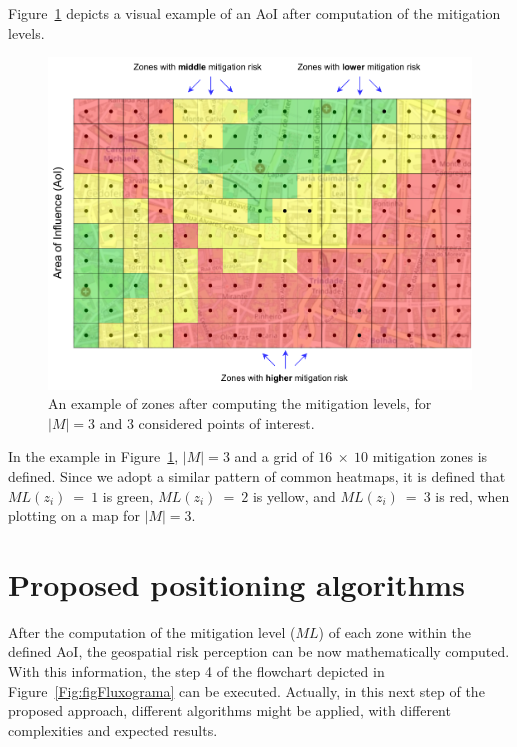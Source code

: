 \begin{refsection}
Figure~\ref{Fig:figGrid2} depicts a visual example of an AoI after computation of the mitigation levels. 


\begin{figure}[htbp!]
  \centering
  \includegraphics[width=0.77\linewidth]{Chapters/2-EDUs/images/MitigationZonesColors.pdf}
  \caption{An example of zones after computing the mitigation levels, for $|M|=3$ and 3 considered points of interest.}\label{Fig:figGrid2}
\end{figure}

In the example in Figure~\ref{Fig:figGrid2}, $|M|=3$ and a grid of $16~\times~10$ mitigation zones is defined. Since we adopt a similar pattern of common heatmaps, it is defined that $ML(z_i)~=~1$ is green, $ML(z_i)~=~2$ is yellow, and $ML(z_i)~=~3$ is red, when plotting on a map for $|M|=3$.


\section{Proposed positioning algorithms}\label{S:4}

After the computation of the mitigation level ($ML$) of each zone within the defined AoI, the geospatial risk perception can be now mathematically computed. With this information, the step 4 of the flowchart depicted in Figure~\ref{Fig:figFluxograma} can be executed. Actually, in this next step of the proposed approach, different algorithms might be applied, with different complexities and expected results. 


\end{refsection}
